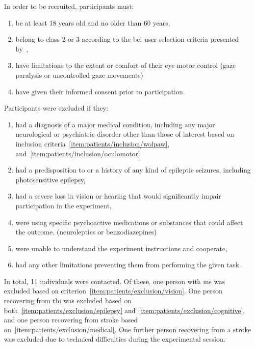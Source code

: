 \documentclass[twocolumn]{article}
\begin{document}
In order to be recruited, participants must:
\begin{enumerate}
  \item be at least 18 years old and no older than 60
	years,
  \item belong to class 2 or 3 according to the \ac{bci}	user selection criteria
    presented by~\textcite{Wolpaw2006},
    \label{item:patients/inclusion/wolpaw}
  \item have limitations to the extent or comfort of their eye motor control
  	(gaze paralysis or uncontrolled gaze movements)
    \label{item:patients/inclusion/oculomotor}
  \item have given their informed consent prior to participation.
\end{enumerate}
Participants were excluded if they:
\begin{enumerate}
  \item had a diagnosis of a major medical condition, including any major
    neurological or psychiatric disorder other than those of interest based on
    inclusion criteria~\ref{item:patients/inclusion/wolpaw},
    and~\ref{item:patients/inclusion/oculomotor}\label{item:patients/exclusion/medical}
  \item had a predisposition to or a history of any kind of epileptic seizures,
    including photosensitive epilepsy,\label{item:patients/exclusion/epilepsy}
  \item had a severe loss in vision or hearing that would significantly impair
        participation in the experiment,\label{item:patients/exclusion/vision}
  \item were using specific psychoactive medications or substances that could affect the outcome.
  (neuroleptics or benzodiazepines)
  \label{item:patients/exclusion/cognitive}
  \item were unable to understand the experiment instructions and cooperate,
  \item had any other limitations preventing them from performing the given task.
\end{enumerate}

In total, 11 individuals were contacted. Of these, one person with
\ac{ms} was excluded based on criterion~\ref{item:patients/exclusion/vision}.
One person recovering from \ac{tbi} was excluded based on both~\ref{item:patients/exclusion/epilepsy}
and~\ref{item:patients/exclusion/cognitive}, and one person recovering from
stroke based on~\ref{item:patients/exclusion/medical}.
One further person recovering from a stroke was excluded due to technical
difficulties during the experimental session.
\end{document}
